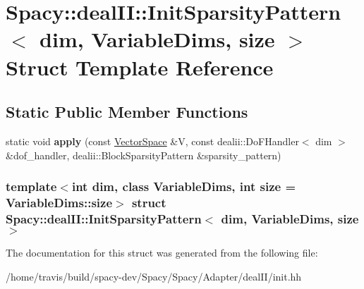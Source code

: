 \hypertarget{structSpacy_1_1dealII_1_1InitSparsityPattern}{\section{\-Spacy\-:\-:deal\-I\-I\-:\-:\-Init\-Sparsity\-Pattern$<$ dim, \-Variable\-Dims, size $>$ \-Struct \-Template \-Reference}
\label{structSpacy_1_1dealII_1_1InitSparsityPattern}
}
\subsection*{\-Static \-Public \-Member \-Functions}
\begin{DoxyCompactItemize}
\item 
\hypertarget{structSpacy_1_1dealII_1_1InitSparsityPattern_a08e919211ab719c01e25a810cab665d5}{static void {\bfseries apply} (const \hyperlink{classSpacy_1_1VectorSpace}{\-Vector\-Space} \&\-V, const dealii\-::\-Do\-F\-Handler$<$ dim $>$ \&dof\-\_\-handler, dealii\-::\-Block\-Sparsity\-Pattern \&sparsity\-\_\-pattern)}\label{structSpacy_1_1dealII_1_1InitSparsityPattern_a08e919211ab719c01e25a810cab665d5}

\end{DoxyCompactItemize}
\subsubsection*{template$<$int dim, class Variable\-Dims, int size = \-Variable\-Dims\-::size$>$ struct Spacy\-::deal\-I\-I\-::\-Init\-Sparsity\-Pattern$<$ dim, Variable\-Dims, size $>$}



\-The documentation for this struct was generated from the following file\-:\begin{DoxyCompactItemize}
\item 
/home/travis/build/spacy-\/dev/\-Spacy/\-Spacy/\-Adapter/deal\-I\-I/init.\-hh\end{DoxyCompactItemize}
